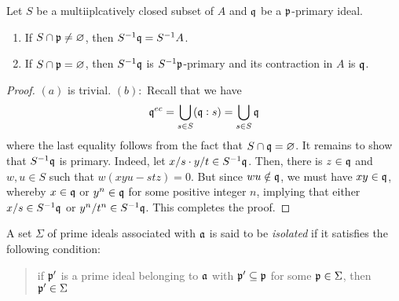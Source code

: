 \begin{proposition}
    Let $S$ be a multiiplcatively closed subset of $A$ and $\mathfrak q$ be a $\mathfrak p$-primary ideal. 
    \begin{enumerate}[label=(\alph*)]
        \item If $S\cap\mathfrak p\ne\varnothing$, then $S^{-1}\mathfrak q = S^{-1}A$. 
        \item If $S\cap\mathfrak p = \varnothing$, then $S^{-1}\mathfrak q$ is $S^{-1}\mathfrak p$-primary and its contraction in $A$ is $\mathfrak q$.
    \end{enumerate}
\end{proposition}
\begin{proof}
    $(a)$ is trivial. $(b):$ Recall that we have 
    \begin{equation*}
        \mathfrak q^{ec} = \bigcup_{s\in S}(\mathfrak q: s) = \bigcup_{s\in S}\mathfrak q
    \end{equation*}
    where the last equality follows from the fact that $S\cap\mathfrak q = \varnothing$. It remains to show that $S^{-1}\mathfrak q$ is primary. Indeed, let $x/s\cdot y/t\in S^{-1}\mathfrak q$. Then, there is $z\in\mathfrak q$ and $w,u\in S$ such that $w(xyu - stz) = 0$. But since $wu\notin\mathfrak q$, we must have $xy\in\mathfrak q$, whereby $x\in\mathfrak q$ or $y^n\in\mathfrak q$ for some positive integer $n$, implying that either $x/s\in S^{-1}\mathfrak q$ or $y^n/t^n\in S^{-1}\mathfrak q$. This completes the proof.
\end{proof}

\begin{definition}
    A set $\Sigma$ of prime ideals associated with $\mathfrak a$ is said to be \emph{isolated} if it satisfies the following condition: 
    \begin{quote}
        if $\mathfrak p'$ is a prime ideal belonging to $\mathfrak a$ with $\mathfrak p'\subseteq\mathfrak p$ for some $\mathfrak p\in\Sigma$, then $\mathfrak p'\in\Sigma$
    \end{quote}
\end{definition}

